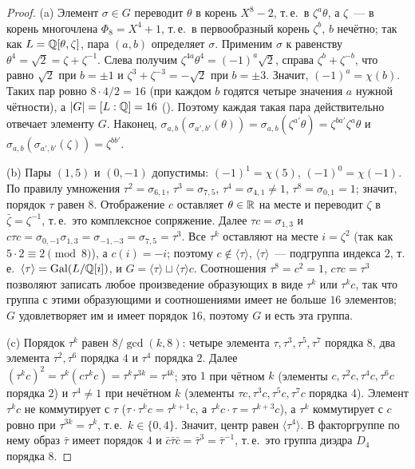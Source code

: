 \begin{proof}
(a) Элемент $\sigma\in G$ переводит $\theta$ в корень $X^8-2$, т.\,е.\ в $\zeta^a\theta$, а $\zeta$~--- в корень многочлена
$\Phi_8=X^4+1$, т.\,е.\ в первообразный корень $\zeta^b$, $b$ нечётно; так как $L=\mathbb Q[\theta,\zeta]$, пара $(a,b)$ определяет
$\sigma$. Применим $\sigma$ к равенству $\theta^4=\sqrt2=\zeta+\zeta^{-1}$. Слева получим $\zeta^{4a}\theta^4=(-1)^a\sqrt2$,
справа $\zeta^b+\zeta^{-b}$, что равно $\sqrt2$ при $b=\pm1$ и $\zeta^3+\zeta^{-3}=-\sqrt2$ при $b=\pm3$. Значит,
$(-1)^a=\chi(b)$. Таких пар ровно $8\cdot4/2=16$ (при каждом $b$ годятся четыре значения $a$ нужной чётности), а $|G|=[L:\mathbb Q]=16$
(). Поэтому каждая такая пара действительно отвечает элементу $G$. Наконец,
$\sigma_{a,b}(\sigma_{a',b'}(\theta))=\sigma_{a,b}(\zeta^{a'}\theta)=\zeta^{ba'}\zeta^{a}\theta$ и
$\sigma_{a,b}(\sigma_{a',b'}(\zeta))=\zeta^{bb'}$.

(b) Пары $(1,5)$ и $(0,-1)$ допустимы: $(-1)^1=\chi(5)$, $(-1)^0=\chi(-1)$. По правилу умножения $\tau^2=\sigma_{6,1}$,
$\tau^3=\sigma_{7,5}$, $\tau^4=\sigma_{4,1}\ne1$, $\tau^8=\sigma_{0,1}=1$; значит, порядок $\tau$ равен $8$. Отображение $c$
оставляет $\theta\in\mathbb R$ на месте и переводит $\zeta$ в $\bar\zeta=\zeta^{-1}$, т.\,е.\ это комплексное сопряжение. Далее
$\tau c=\sigma_{1,3}$ и $c\tau c=\sigma_{0,-1}\sigma_{1,3}=\sigma_{-1,-3}=\sigma_{7,5}=\tau^3$. Все $\tau^k$ оставляют на месте
$i=\zeta^2$ (так как $5\cdot2\equiv2\pmod8$), а $c(i)=-i$; поэтому $c\notin\langle\tau\rangle$, $\langle\tau\rangle$~---
подгруппа индекса $2$, т.\,е.\ $\langle\tau\rangle=\operatorname{Gal}(L/\mathbb Q[i])$, и $G=\langle\tau\rangle\sqcup\langle\tau\rangle c$.
Соотношения $\tau^8=c^2=1$, $c\tau c=\tau^3$ позволяют записать любое произведение образующих в виде $\tau^k$ или $\tau^kc$,
так что группа с этими образующими и соотношениями имеет не больше $16$ элементов; $G$ удовлетворяет им и имеет
порядок $16$, поэтому $G$ и есть эта группа.

(c) Порядок $\tau^k$ равен $8/\gcd(k,8)$: четыре элемента $\tau,\tau^3,\tau^5,\tau^7$ порядка $8$, два элемента
$\tau^2,\tau^6$ порядка $4$ и $\tau^4$ порядка $2$. Далее $(\tau^kc)^2=\tau^k(c\tau^kc)=\tau^{k}\tau^{3k}=\tau^{4k}$; это $1$
при чётном $k$ (элементы $c,\tau^2c,\tau^4c,\tau^6c$ порядка $2$) и $\tau^4\ne1$ при нечётном $k$ (элементы
$\tau c,\tau^3c,\tau^5c,\tau^7c$ порядка $4$). Элемент $\tau^kc$ не коммутирует с $\tau$ ($\tau\cdot\tau^kc=\tau^{k+1}c$, а
$\tau^kc\cdot\tau=\tau^{k+3}c$), а $\tau^k$ коммутирует с $c$ ровно при $\tau^{3k}=\tau^k$, т.\,е.\ $k\in\{0,4\}$. Значит, центр
равен $\langle\tau^4\rangle$. В факторгруппе по нему образ $\bar\tau$ имеет порядок $4$ и $\bar c\bar\tau\bar c=\bar\tau^3=\bar\tau^{-1}$,
т.\,е.\ это группа диэдра $D_4$ порядка $8$.
\end{proof}

